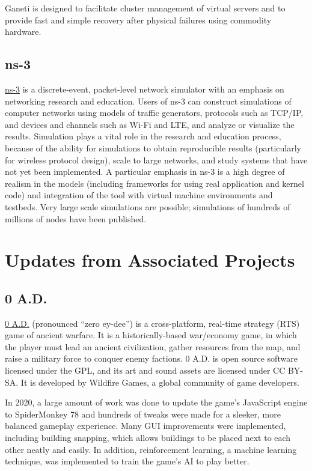 \documentclass[a4paper]{report}
\begin{document}
Ganeti is designed to facilitate cluster management of virtual servers and to provide fast and simple recovery after physical failures using commodity hardware.

\subsection{ns-3}

\href{https://www.nsnam.org/}{ns-3} is a discrete-event, packet-level network simulator with an emphasis on networking research and education. Users of ns-3 can construct simulations of computer networks using models of traffic generators, protocols such as TCP/IP, and devices and channels such as Wi-Fi and LTE, and analyze or visualize the results. Simulation plays a vital role in the research and education process, because of the ability for simulations to obtain reproducible results (particularly for wireless protocol design), scale to large networks, and study systems that have not yet been implemented. A particular emphasis in ns-3 is a high degree of realism in the models (including frameworks for using real application and kernel code) and integration of the tool with virtual machine environments and testbeds. Very large scale simulations are possible; simulations of hundreds of millions of nodes have been published.

\section{Updates from Associated Projects}

\subsection{0 A.D.}

\href{https://play0ad.com/}{0 A.D.} (pronounced ``zero ey-dee'') is a cross-platform, real-time strategy (RTS) game of ancient warfare. It is a historically-based war/economy game, in which the player must lead an ancient civilization, gather resources from the map, and raise a military force to conquer enemy factions. 0 A.D.  is open source software licensed under the GPL, and its art and sound assets are licensed under CC BY-SA. It is developed by Wildfire Games, a global community of game developers.

In 2020, a large amount of work was done to update the game's JavaScript engine to SpiderMonkey 78 and hundreds of tweaks were made for a sleeker, more balanced gameplay experience. Many GUI improvements were implemented, including building snapping, which allows buildings to be placed next to each other neatly and easily. In addition, reinforcement learning, a machine learning technique, was implemented to train the game's AI to play better.
\end{document}
